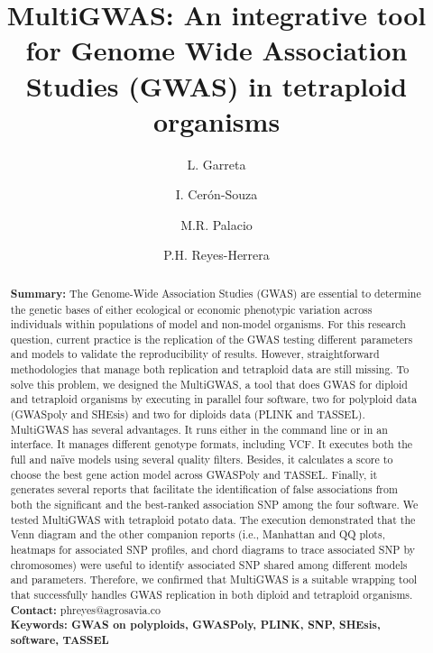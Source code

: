 \documentclass{article}
\begin{document}
\title{MultiGWAS: An integrative tool for Genome Wide Association Studies (GWAS) in tetraploid organisms}

\author[1]{L. Garreta}
\author[1]{I. Cer\'{o}n-Souza}
\author[2]{M.R. Palacio}
\author[1]{P.H. Reyes-Herrera}




\maketitle

\begin{abstract}
\textbf{Summary:} The Genome-Wide Association Studies (GWAS) are essential to determine the genetic bases of either ecological or economic phenotypic variation across individuals within populations of model and non-model organisms. For this research question, current practice is the replication of the GWAS testing different parameters and models to validate the reproducibility of results. However, straightforward methodologies that manage both replication and tetraploid data are still missing. To solve this problem, we designed the MultiGWAS, a tool that does GWAS for diploid and tetraploid organisms by executing in parallel four software, two for polyploid data (GWASpoly and SHEsis) and two for diploids data (PLINK and TASSEL). MultiGWAS has several advantages. It runs either in the command line or in an interface. It manages different genotype formats, including VCF. It executes both the full and naïve models using several quality filters. Besides, it calculates a score to choose the best gene action model across GWASPoly and TASSEL. Finally, it generates several reports that facilitate the identification of false associations from both the significant and the best-ranked association SNP among the four software. We tested MultiGWAS with tetraploid potato data. The execution demonstrated that the Venn diagram and the other companion reports (i.e., Manhattan and QQ plots, heatmaps for associated SNP profiles, and chord diagrams to trace associated SNP by chromosomes) were useful to identify associated SNP shared among different models and parameters. Therefore, we confirmed that MultiGWAS is a suitable wrapping tool that successfully handles GWAS replication in both diploid and tetraploid organisms. \\
\textbf{Contact:} phreyes@agrosavia.co\\
\textbf{Keywords: GWAS on polyploids, GWASPoly, PLINK, SNP, SHEsis, software, TASSEL}
\end{abstract}
\end{document}
